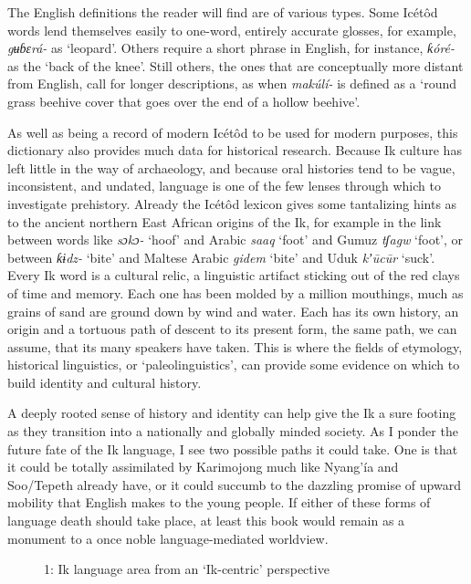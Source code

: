 The English definitions the reader will find are of various types. Some Icétôd words lend themselves easily to one-word, entirely accurate glosses, for example, \textit{gʉɓɛrá- }as ‘leopard’. Others require a short phrase in English, for instance, \textit{ƙóré- }as the ‘back of the knee’. Still others, the ones that are conceptually more distant from English, call for longer descriptions, as when \textit{makúlí- }is defined as a ‘round grass beehive cover that goes over the end of a hollow beehive’.

As well as being a record of modern Icétôd to be used for modern purposes, this dictionary also provides much data for historical research. Because Ik culture has left little in the way of archaeology, and because oral histories tend to be vague, inconsistent, and undated, language is one of the few lenses through which to investigate prehistory. Already the Icétôd lexicon gives some tantalizing hints as to the ancient northern East African origins of the Ik, for example in the link between words like \textit{sɔkɔ- }‘hoof’ and Arabic \textit{saaq }‘foot’ and Gumuz \textit{tʃagw }‘foot’, or between \textit{ƙɨdz- }‘bite’ and Maltese Arabic \textit{gidem }‘bite’ and Uduk \textit{kʼ\={u}c\={u}r }‘suck’. Every Ik word is a cultural relic, a linguistic artifact sticking out of the red clays of time and memory. Each one has been molded by a million mouthings, much as grains of sand are ground down by wind and water. Each has its own history, an origin and a tortuous path of descent to its present form, the same path, we can assume, that its many speakers have taken. This is where the fields of etymology, historical linguistics, or ‘paleolinguistics’, can provide some evidence on which to build identity and cultural history.

A deeply rooted sense of history and identity can help give the Ik a sure footing as they transition into a nationally and globally minded society. As I ponder the future fate of the Ik language, I see two possible paths it could take. One is that it could be totally assimilated by Karimojong much like Nyang’ía and Soo/Tepeth already have, or it could succumb to the dazzling promise of upward mobility that English makes to the young people. If either of these forms of language death should take place, at least this book would remain as a monument to a once noble language-mediated worldview.

   

\begin{figure}
\caption{1: Ik language area from an ‘Ik-centric’ perspective}
\label{fig:1}
\end{figure}

